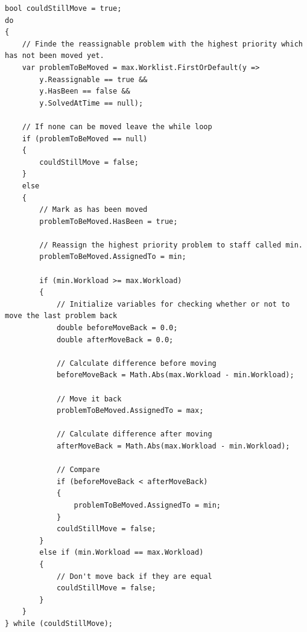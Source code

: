 


\begin{lstlisting}[style=sourceCode, caption=\myCaption{A code snippet of the balance workload method. The presented code is within a for loop running for each staff member minus one. ``min'' and ``max'' are the person objects of which the algorithm are currently moving problems between.}, label=lst:balanceWorkload]
bool couldStillMove = true;
do
{
    // Finde the reassignable problem with the highest priority which has not been moved yet. 
    var problemToBeMoved = max.Worklist.FirstOrDefault(y =>
	    y.Reassignable == true &&
	    y.HasBeen == false &&
	    y.SolvedAtTime == null);
                  
    // If none can be moved leave the while loop
    if (problemToBeMoved == null)
    {
        couldStillMove = false;
    }
    else
    {
        // Mark as has been moved
        problemToBeMoved.HasBeen = true;

        // Reassign the highest priority problem to staff called min.
        problemToBeMoved.AssignedTo = min;

        if (min.Workload >= max.Workload)
        {
            // Initialize variables for checking whether or not to move the last problem back
            double beforeMoveBack = 0.0;
            double afterMoveBack = 0.0;

            // Calculate difference before moving
            beforeMoveBack = Math.Abs(max.Workload - min.Workload);

            // Move it back
            problemToBeMoved.AssignedTo = max;

            // Calculate difference after moving
            afterMoveBack = Math.Abs(max.Workload - min.Workload);

            // Compare
            if (beforeMoveBack < afterMoveBack)
            {
                problemToBeMoved.AssignedTo = min;
            }
            couldStillMove = false;
        }
        else if (min.Workload == max.Workload)
        {
            // Don't move back if they are equal
            couldStillMove = false;
        }
    }
} while (couldStillMove);



\end{lstlisting}



